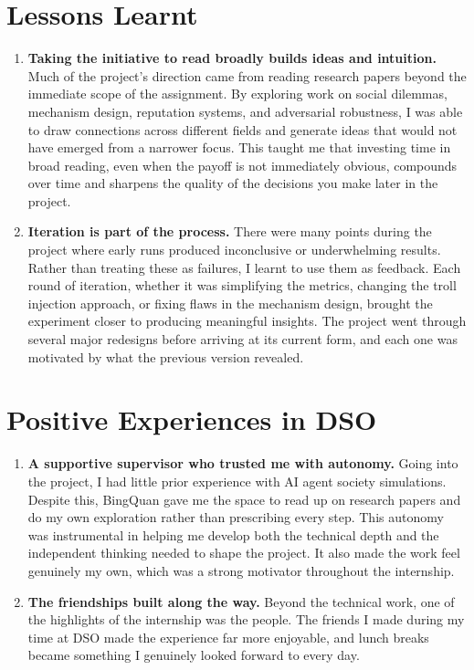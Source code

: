 \documentclass[12pt,a4paper]{article}
\begin{document}
\section{Lessons Learnt}

\begin{enumerate}[leftmargin=2em]
    \item \textbf{Taking the initiative to read broadly builds ideas and intuition.} Much of the project's direction came from reading research papers beyond the immediate scope of the assignment. By exploring work on social dilemmas, mechanism design, reputation systems, and adversarial robustness, I was able to draw connections across different fields and generate ideas that would not have emerged from a narrower focus. This taught me that investing time in broad reading, even when the payoff is not immediately obvious, compounds over time and sharpens the quality of the decisions you make later in the project.
    \item \textbf{Iteration is part of the process.} There were many points during the project where early runs produced inconclusive or underwhelming results. Rather than treating these as failures, I learnt to use them as feedback. Each round of iteration, whether it was simplifying the metrics, changing the troll injection approach, or fixing flaws in the mechanism design, brought the experiment closer to producing meaningful insights. The project went through several major redesigns before arriving at its current form, and each one was motivated by what the previous version revealed.
\end{enumerate}

\section{Positive Experiences in DSO}

\begin{enumerate}[leftmargin=2em]
    \item \textbf{A supportive supervisor who trusted me with autonomy.} Going into the project, I had little prior experience with AI agent society simulations. Despite this, BingQuan gave me the space to read up on research papers and do my own exploration rather than prescribing every step. This autonomy was instrumental in helping me develop both the technical depth and the independent thinking needed to shape the project. It also made the work feel genuinely my own, which was a strong motivator throughout the internship.
    \item \textbf{The friendships built along the way.} Beyond the technical work, one of the highlights of the internship was the people. The friends I made during my time at DSO made the experience far more enjoyable, and lunch breaks became something I genuinely looked forward to every day.
\end{enumerate}
\end{document}
